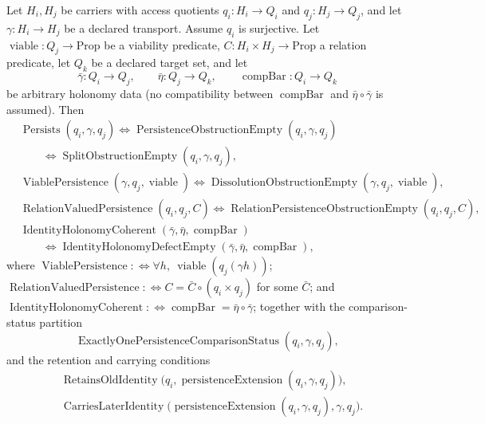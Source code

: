 \begin{theorem}\label{thm:F19}
Let \(H_i,H_j\) be carriers with access quotients
\(q_i:H_i\to Q_i\) and \(q_j:H_j\to Q_j\), and let
\(\gamma:H_i\to H_j\) be a declared transport.  Assume \(q_i\) is surjective.  Let
\(\operatorname{viable}:Q_j\to\mathrm{Prop}\) be a viability
predicate, \(C:H_i\times H_j\to\mathrm{Prop}\) a relation predicate,
let \(Q_k\) be a declared target set, and let
\[
  \bar\gamma:Q_i\to Q_j,\qquad
  \bar\eta:Q_j\to Q_k,\qquad
  \operatorname{compBar}:Q_i\to Q_k
\]
be arbitrary holonomy data (no compatibility between
\(\operatorname{compBar}\) and \(\bar\eta\circ\bar\gamma\) is
assumed).  Then
\begin{align*}
  &\operatorname{Persists}(q_i,\gamma,q_j)
    \iff
    \operatorname{PersistenceObstructionEmpty}(q_i,\gamma,q_j)\\
  &\qquad{}\iff
    \operatorname{SplitObstructionEmpty}(q_i,\gamma,q_j),\\
  &\operatorname{ViablePersistence}(\gamma,q_j,\operatorname{viable})
    \iff
    \operatorname{DissolutionObstructionEmpty}
      (\gamma,q_j,\operatorname{viable}),\\
  &\operatorname{RelationValuedPersistence}(q_i,q_j,C)
    \iff
    \operatorname{RelationPersistenceObstructionEmpty}(q_i,q_j,C),\\
  &\operatorname{IdentityHolonomyCoherent}
      (\bar\gamma,\bar\eta,\operatorname{compBar})\\
  &\qquad{}\iff
    \operatorname{IdentityHolonomyDefectEmpty}
      (\bar\gamma,\bar\eta,\operatorname{compBar}),
\end{align*}
where \(\operatorname{ViablePersistence}:\Longleftrightarrow\forall h,\
\operatorname{viable}(q_j(\gamma h))\);
\(\operatorname{RelationValuedPersistence}:\Longleftrightarrow C=\bar C\circ(q_i\times
q_j)\) for some \(\bar C\); and
\(\operatorname{IdentityHolonomyCoherent}:\Longleftrightarrow\operatorname{compBar}=\bar\eta\circ\bar\gamma\);
together with the comparison-status partition
\[
  \operatorname{ExactlyOnePersistenceComparisonStatus}
    (q_i,\gamma,q_j),
\]
and the retention and carrying conditions
\begin{align*}
  &\operatorname{RetainsOldIdentity}
      \bigl(q_i,\operatorname{persistenceExtension}(q_i,\gamma,q_j)\bigr),\\
  &\operatorname{CarriesLaterIdentity}
      \bigl(\operatorname{persistenceExtension}(q_i,\gamma,q_j),
        \gamma,q_j\bigr).
\end{align*}

\end{theorem}
